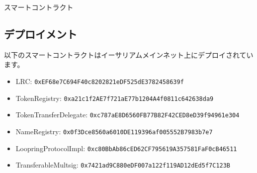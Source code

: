 \documentclass{article}
\makeatletter
\newenvironment{figurehere}
 {\def\@captype{figure}}
 {}
\makeatother
\begin{document}
\begin{appendices}
\begin{center}
\begin{figurehere}
\caption{スマートコントラクト}
\label{fig:smartcontracts}
\end{figurehere}
\end{center}

\subsection{デプロイメント}

以下のスマートコントラクトはイーサリアムメインネット上にデプロイされています。
\begin{itemize}
\item LRC: \verb|0xEF68e7C694F40c8202821eDF525dE3782458639f|
\item TokenRegistry: \verb|0xa21c1f2AE7f721aE77b1204A4f0811c642638da9|
\item TokenTransferDelegate: \verb|0xc787aE8D6560FB77B82F42CED8eD39f94961e304|
\item NameRegistry: \verb|0x0f3Dce8560a6010DE119396af005552B7983b7e7|
\item LoopringProtocolImpl: \verb|0xc80BbAb86cED62CF795619A357581FaF0cB46511|
\item TransferableMultsig: \verb|0x7421ad9C880eDF007a122f119AD12dEd5f7C123B|
\end{itemize}

\end{appendices}
\end{document}
